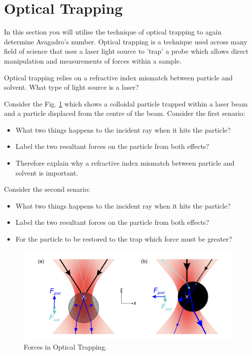 \documentclass[12pt,a4paper,twoside]{article}
\begin{document}
\newpage
\section{Optical Trapping}

In this section you will utilise the technique of optical trapping to again determine Avagadro's number. Optical trapping is a technique used across many field of science that uses a laser light source to 'trap' a probe which allows direct manipulation and measurements of forces within a sample.

Optical trapping relies on a refractive index mismatch between particle and solvent. 
What type of light source is a laser?
\vspace{2cm} 

Consider the Fig. \ref{fig:trap} which shows a colloidal particle trapped within a laser beam and a particle displaced from the centre of the beam.
Consider the first senario:
\begin{itemize}
	\item What two things happens to the incident ray when it hits the particle?
	\vspace{2cm}
	\item Label the two resultant forces on the particle from both effects?
	\vspace{2cm}
	\item Therefore explain why a refractive index mismatch between particle and solvent is important.
	\vspace{2cm}
\end{itemize}

Consider the second senario:
\begin{itemize}
	\item What two things happens to the incident ray when it hits the particle?
	\vspace{2cm}
	\item Label the two resultant forces on the particle from both effects?
	\vspace{2cm}
	\item For the particle to be restored to the trap which force must be greater?
\end{itemize}

\begin{figure}
    \centering
    \includegraphics[width=1\linewidth]{Trapping.png}
    \caption{Forces in Optical Trapping.}
    \label{fig:trap}
\end{figure}
\end{document}
